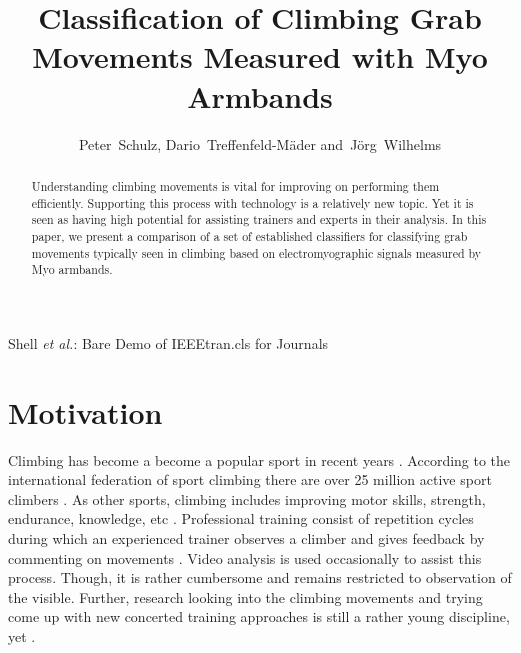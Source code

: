 \documentclass[journal]{IEEEtran}
\begin{document}
%
\title{Classification of Climbing Grab Movements Measured with Myo Armbands}
\author{Peter~Schulz,
        Dario~Treffenfeld-M\"ader
        and~J\"org~Wilhelms}

%
{Shell \MakeLowercase{\textit{et al.}}: Bare Demo of IEEEtran.cls for Journals}

\maketitle


\begin{abstract}
Understanding climbing movements is vital for improving on performing them efficiently. Supporting this process with technology is a relatively new topic. Yet it is seen as having high potential for assisting trainers and experts in their analysis. In this paper, we present a comparison of a set of established classifiers for classifying grab movements typically seen in climbing based on electromyographic signals measured by Myo armbands.  
\end{abstract}

\section{Motivation}

Climbing has become a become a popular sport in recent years \autocite{freizeitklettern}. According to the international federation of sport climbing there are over 25 million active sport climbers \autocite{IFSC:figures}. As other sports, climbing includes improving motor skills, strength, endurance, knowledge, etc \autocite{Kajastila:2014:ACI:2611780.2581139}. Professional training consist of repetition cycles during which an experienced trainer observes a climber and gives feedback by commenting on movements \autocite{Ladha:2013:CSA:2493432.2493492}. Video analysis is used occasionally to assist this process. Though, it is rather cumbersome and remains restricted to observation of the visible. Further, research looking into the climbing movements and trying come up with new concerted training approaches is still a rather young discipline, yet \autocite{denk}.
\end{document}
